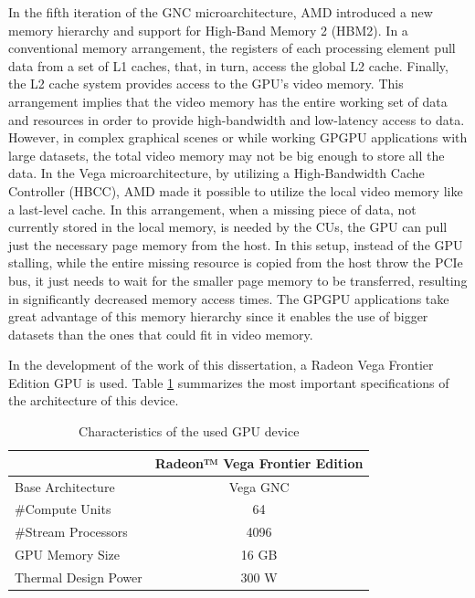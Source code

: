 In the fifth iteration of the GNC microarchitecture, AMD introduced a new memory hierarchy and support for High-Band Memory 2 (HBM2). In a conventional memory arrangement, the registers of each processing element pull data from a set of L1 caches, that, in turn, access the global L2 cache. Finally, the L2 cache system provides access to the GPU's video memory. This arrangement implies that the video memory has the entire working set of data and resources in order to provide high-bandwidth and low-latency access to data. However, in complex graphical scenes or while working GPGPU applications with large datasets, the total video memory may not be big enough to store all the data. In the Vega microarchitecture, by utilizing a  High-Bandwidth Cache Controller (HBCC), AMD made it possible to utilize the local video memory like a last-level cache. In this arrangement, when a missing piece of data, not currently stored in the local memory, is needed by the CUs, the GPU can pull just the necessary page memory from the host. In this setup, instead of the GPU stalling, while the entire missing resource is copied from the host throw the PCIe bus, it just needs to wait for the smaller page memory to be transferred, resulting in significantly decreased memory access times. The GPGPU applications take great advantage of this memory hierarchy since it enables the use of bigger datasets than the ones that could fit in video memory.

In the development of the work of this dissertation, a Radeon Vega Frontier Edition GPU is used. Table \ref{tab:gpusepcs} summarizes the most important specifications of the architecture of this device.

\begin{table}[!htb]
    \renewcommand{\arraystretch}{1.2} %
    \centering
        \begin{tabular}{lc}
            \multicolumn{1}{c}{\textbf{}} & \multicolumn{1}{l}{\textbf{Radeon™ Vega Frontier Edition}} \\ \hline
            Base Architecture             & Vega GNC                                                   \\
            \#Compute Units               & 64                                                         \\
            \#Stream Processors           & 4096                                                       \\
            GPU Memory Size               & 16 GB                                                      \\
            Thermal Design Power          & 300 W                                                      \\ \hline
        \end{tabular}
    \caption{Characteristics of the used GPU device}
    \label{tab:gpusepcs}
\end{table}

